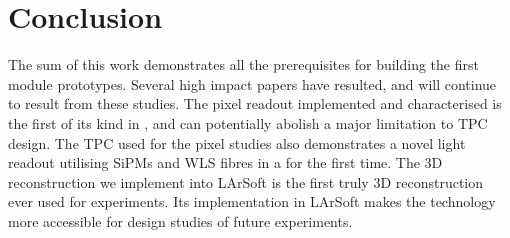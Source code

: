 \chapter{Conclusion}
\label{chap:conclusion}


The sum of this work demonstrates all the prerequisites for building the first \AC{} module prototypes.
Several high impact papers have resulted, and will continue to result from these studies.
The pixel readout implemented and characterised is the first of its kind in \lar{}, and can potentially abolish a major limitation to TPC design.
The TPC used for the pixel studies also demonstrates a novel light readout utilising SiPMs and WLS fibres in a \lartpc{} for the first time.
The 3D reconstruction we implement into LArSoft is the first truly 3D reconstruction ever used for \lar{} experiments.
Its implementation in LArSoft makes the technology more accessible for design studies of future experiments.
